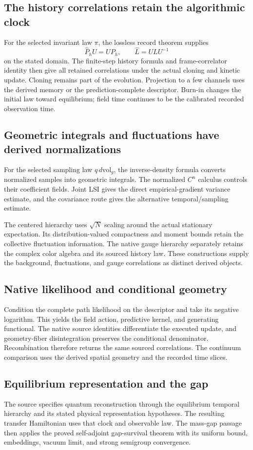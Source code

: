 \documentclass[11pt,a4paper]{article}
\begin{document}
\subsection{The history correlations retain the algorithmic clock}
For the selected invariant law \(\pi\), the lossless record theorem supplies
\[
\widehat P_hU=UP_h,\qquad
\widehat L=ULU^{-1}
\]
on the stated domain. The finite-step history formula and frame-correlator identity then give all retained correlations under the actual cloning and kinetic update. Cloning remains part of the evolution. Projection to a few channels uses the derived memory or the prediction-complete descriptor. Burn-in changes the initial law toward equilibrium; field time continues to be the calibrated recorded observation time.

\subsection{Geometric integrals and fluctuations have derived normalizations}
For the selected sampling law \(q\,d\mathrm{vol}_g\), the inverse-density formula converts normalized samples into geometric integrals. The normalized \(C^n\) calculus controls their coefficient fields. Joint LSI gives the direct empirical-gradient variance estimate, and the covariance route gives the alternative temporal/sampling estimate.

The centered hierarchy uses \(\sqrt N\) scaling around the actual stationary expectation. Its distribution-valued compactness and moment bounds retain the collective fluctuation information. The native gauge hierarchy separately retains the complex color algebra and its sourced history law. These constructions supply the background, fluctuations, and gauge correlations as distinct derived objects.

\subsection{Native likelihood and conditional geometry}
Condition the complete path likelihood on the descriptor and take its negative logarithm. This yields the field action, predictive kernel, and generating functional. The native source identities differentiate the executed update, and geometry-fiber disintegration preserves the conditional denominator. Recombination therefore returns the same sourced correlations. The continuum comparison uses the derived spatial geometry and the recorded time slices.

\subsection{Equilibrium representation and the gap}
The source specifies quantum reconstruction through the equilibrium temporal hierarchy and its stated physical representation hypotheses. The resulting transfer Hamiltonian uses that clock and observable law. The mass-gap passage then applies the proved self-adjoint gap-survival theorem with its uniform bound, embeddings, vacuum limit, and strong semigroup convergence.
\end{document}
